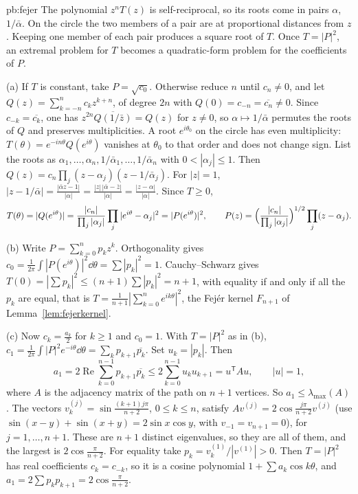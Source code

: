 \begin{solution}{pb:fejer}
\idea The polynomial $z^nT(z)$ is self-reciprocal, so its roots come in pairs $\alpha$, $1/\bar\alpha$. On the circle the two members of a pair
are at proportional distances from $z$. Keeping one member of each pair produces a square root of $T$. Once $T=|P|^2$, an extremal problem
for $T$ becomes a quadratic-form problem for the coefficients of $P$.

\writeup (a) If $T$ is constant, take $P=\sqrt{c_0}$. Otherwise reduce $n$ until $c_n\ne0$, and let $Q(z)=\sum_{k=-n}^nc_kz^{k+n}$, of degree $2n$ with $Q(0)=c_{-n}=\overline{c_n}\ne0$.
Since $c_{-k}=\overline{c_k}$, one has $z^{2n}\overline{Q(1/\bar z)}=Q(z)$ for $z\ne0$, so $\alpha\mapsto1/\bar\alpha$ permutes the roots of $Q$ and preserves multiplicities. A root
$e^{i\theta_0}$ on the circle has even multiplicity: $T(\theta)=e^{-in\theta}Q(e^{i\theta})$ vanishes at $\theta_0$ to that order and does not change
sign. List the roots as $\alpha_1,\dots,\alpha_n,1/\bar\alpha_1,\dots,1/\bar\alpha_n$ with $0<|\alpha_j|\le1$. Then $Q(z)=c_n\prod_j(z-\alpha_j)(z-1/\bar\alpha_j)$. For $|z|=1$,
$|z-1/\bar\alpha|=\frac{|\bar\alpha z-1|}{|\alpha|}=\frac{|z|\,|\bar\alpha-\bar z|}{|\alpha|}=\frac{|z-\alpha|}{|\alpha|}$. Since $T\ge0$,
\[
T(\theta)=|Q(e^{i\theta})|=\frac{|c_n|}{\prod_j|\alpha_j|}\prod_j|e^{i\theta}-\alpha_j|^2=|P(e^{i\theta})|^2,\qquad P(z)=\Bigl(\frac{|c_n|}{\prod_j|\alpha_j|}\Bigr)^{1/2}\prod_j(z-\alpha_j).
\]

(b) Write $P=\sum_{k=0}^np_kz^k$. Orthogonality gives $c_0=\frac1{2\pi}\int|P(e^{i\theta})|^2\dd\theta=\sum|p_k|^2=1$. Cauchy--Schwarz gives
$T(0)=|\sum p_k|^2\le(n+1)\sum|p_k|^2=n+1$, with equality if and only if all the $p_k$ are equal, that is $T=\frac1{n+1}|\sum_{k=0}^ne^{ik\theta}|^2$, the Fejér kernel $F_{n+1}$ of
Lemma~\ref{lem:fejerkernel}.

(c) Now $c_k=\frac{a_k}2$ for $k\ge1$ and $c_0=1$. With $T=|P|^2$ as in (b), $c_1=\frac1{2\pi}\int|P|^2e^{-i\theta}\dd\theta=\sum_kp_{k+1}\overline{p_k}$. Set $u_k=|p_k|$. Then
\[
a_1=2\operatorname{Re}\sum_{k=0}^{n-1}p_{k+1}\overline{p_k}\le2\sum_{k=0}^{n-1}u_ku_{k+1}=u^{\mathsf T}Au,\qquad|u|=1,
\]
where $A$ is the adjacency matrix of the path on $n+1$ vertices. So $a_1\le\lambda_{\max}(A)$. The vectors $v^{(j)}_k=\sin\frac{(k+1)j\pi}{n+2}$, $0\le k\le n$, satisfy
$Av^{(j)}=2\cos\frac{j\pi}{n+2}v^{(j)}$ (use $\sin(x-y)+\sin(x+y)=2\sin x\cos y$, with $v_{-1}=v_{n+1}=0$), for $j=1,\dots,n+1$. These are $n+1$ distinct eigenvalues,
so they are all of them, and the largest is $2\cos\frac\pi{n+2}$. For equality take $p_k=v^{(1)}_k/|v^{(1)}|>0$. Then $T=|P|^2$ has real coefficients $c_k=c_{-k}$, so it is
a cosine polynomial $1+\sum a_k\cos k\theta$, and $a_1=2\sum p_kp_{k+1}=2\cos\frac\pi{n+2}$.


\end{solution}
